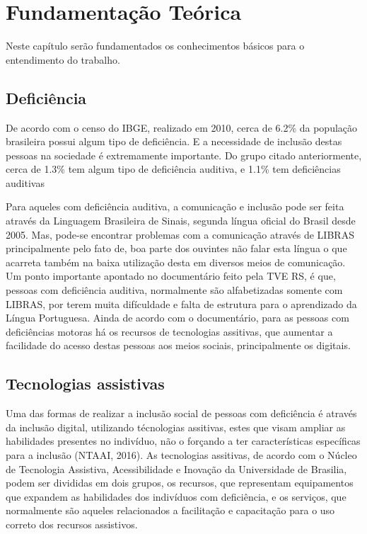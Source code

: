 \chapter{Fundamentação Teórica}
\label{ch:fundamentacao}
\par Neste capítulo ser\~ao fundamentados os conhecimentos b\'asicos para o entendimento do trabalho.

\section{Deficiência} %

De acordo com o censo do IBGE, realizado em 2010, cerca de 6.2\% da população brasileira possui algum tipo de deficiência. E a necessidade de inclusão destas pessoas na sociedade é extremamente importante. Do grupo citado anteriormente, cerca de 1.3\% tem algum tipo de deficiência auditiva, e 1.1\% tem deficiências auditivas

Para aqueles com deficiência auditiva, a comunicação e inclusão pode ser feita através da Linguagem Brasileira de Sinais, segunda língua oficial do Brasil desde 2005. Mas, pode-se encontrar problemas com a comunicação através de LIBRAS principalmente pelo fato de, boa parte dos ouvintes não falar esta língua o que acarreta também na baixa utilização desta em diversos meios de comunicação. Um ponto importante apontado no documentário feito pela TVE RS, é que, pessoas com deficiência auditiva, normalmente são alfabetizadas somente com LIBRAS, por terem muita difículdade e falta de estrutura para o aprendizado da Língua Portuguesa. Ainda de acordo com o documentário, para as pessoas com deficiências motoras há os recursos de tecnologias assitivas, que aumentar a facilidade do acesso destas pessoas aos meios sociais, principalmente os digitais.


\section{Tecnologias assistivas}

Uma das formas de realizar a inclusão social de pessoas com deficiência é através da inclusão digital, utilizando técnologias assitivas, estes que visam ampliar as habilidades presentes no indivíduo, não o forçando a ter características específicas para a inclusão (NTAAI, 2016). As tecnologias assitivas, de acordo com o Núcleo de Tecnologia Assistiva, Acessibilidade e Inovação da Universidade de Brasilia, podem ser divididas em dois grupos, os recursos, que representam equipamentos que expandem as habilidades dos indivíduos com deficiência, e os serviços, que normalmente são aqueles relacionados a facilitação e capacitação para o uso correto dos recursos assistivos.

